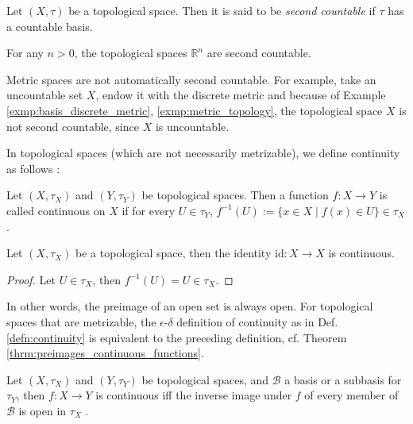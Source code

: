 \begin{defn}
	Let $(X, \tau)$ be a topological space. Then it is said to be \textit{second countable} if $\tau$ has a countable basis. 
\end{defn}

\begin{exmp}
	For any $n > 0$, the topological spaces $\mathbb R^n$ are second countable. 
\end{exmp}

\begin{remark}
	Metric spaces are not automatically second countable. For example, take an uncountable set $X$, endow it with the discrete metric and because of Example \ref{exmp:basis_discrete_metric}, \ref{exmp:metric_topology},  the topological space $X$ is not second countable, since $X$ is uncountable. 
\end{remark}	

In topological spaces (which are not necessarily metrizable), we define continuity as follows \cite{topology-singh}:

\begin{defn}\label{defn:continuity_topological_spaces}
	Let $(X, \tau_X)$ and $(Y, \tau_Y)$ be topological spaces. Then a function $f: X \to Y$ is called continuous on $X$ if for every $U\in \tau_Y$, $f^{-1}(U) := \{ x\in X \mid f(x)\in U \} \in \tau_X$.
\end{defn}

\begin{exmp}
	Let $(X, \tau_X)$ be a topological space, then the identity $\text{id}: X\to X$ is continuous.
\end{exmp}

\begin{proof}
	Let $U\in \tau_X$, then $f^{-1}(U) = U\in\tau_X$.
\end{proof}

\begin{remark}
	In other words, the preimage of an open set is always open. For topological spaces that are metrizable, the $\epsilon$-$\delta$ definition of continuity as in Def. \ref{defn:continuity} is equivalent to the preceding definition, cf. Theorem \ref{thrm:preimages_continuous_functions}.
\end{remark}

\begin{theorem}\label{thrm:continuity_sub_basis}
	Let $(X, \tau_X)$ and $(Y, \tau_Y)$ be topological spaces, and $\mathscr B$ a basis or a subbasis for $\tau_Y$, then $f: X\to Y$ is continuous iff the inverse image under $f$ of every member of $\mathscr B$ is open in $\tau_X$ \cite{topology-singh}. 
\end{theorem}

